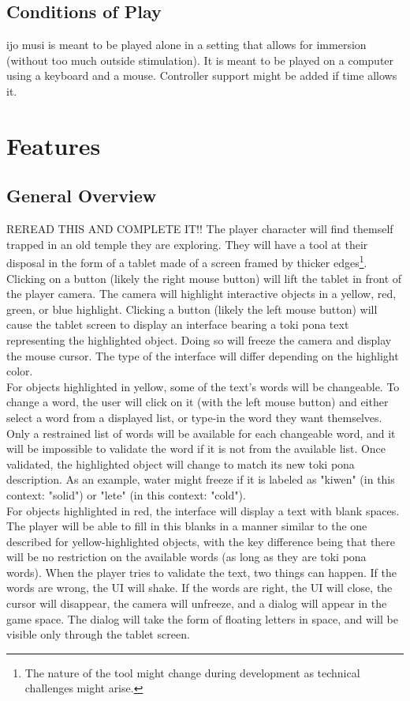 \documentclass{scrartcl}
\begin{document}
		\subsection{Conditions of Play}
			ijo musi is meant to be played alone in a setting that allows for immersion (without too much outside stimulation). It is meant to be played on a computer using a keyboard and a mouse. Controller support might be added if time allows it.  
	\section{Features}
		\subsection{General Overview}
		REREAD THIS AND COMPLETE IT!!
			The player character will find themself trapped in an old temple they are exploring. They will have a tool at their disposal in the form of a tablet made of a screen framed by thicker edges\footnote{The nature of the tool might change during development as technical challenges might arise.}. Clicking on a button (likely the right mouse button) will lift the tablet in front of the player camera. The camera will highlight interactive objects in a yellow, red, green, or blue highlight. Clicking a button (likely the left mouse button) will cause the tablet screen to display an interface bearing a toki pona text representing the highlighted object. Doing so will freeze the camera and display the mouse cursor. The type of the interface will differ depending on the highlight color.\\
			For objects highlighted in yellow, some of the text's words will be changeable. To change a word, the user will click on it (with the left mouse button) and either select a word from a displayed list, or type-in the word they want themselves. Only a restrained list of words will be available for each changeable word, and it will be impossible to validate the word if it is not from the available list. Once validated, the highlighted object will change to match its new toki pona description. As an example, water might freeze if it is labeled as "kiwen" (in this context: "solid") or "lete" (in this context: "cold").\\
			For objects highlighted in red, the interface will display a text with blank spaces. The player will be able to fill in this blanks in a manner similar to the one described for yellow-highlighted objects, with the key difference being that there will be no restriction on the available words (as long as they are toki pona words). When the player tries to validate the text, two things can happen. If the words are wrong, the UI will shake. If the words are right, the UI will close, the cursor will disappear, the camera will unfreeze, and a dialog will appear in the game space. The dialog will take the form of floating letters in space, and will be visible only through the tablet screen.\\
\end{document}
